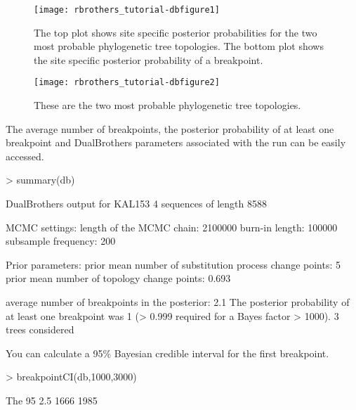 \documentclass[12pt]{article}
\begin{document}
\begin{figure}[!t]
  \centering
\texttt{[image: rbrothers\_tutorial-dbfigure1]}
\caption{The top plot shows site specific posterior probabilities for the two most probable phylogenetic tree topologies. The bottom plot shows the site specific posterior probability of a breakpoint.}
\label{KALplot}
\end{figure}  

\begin{figure}[!t]
  \centering
\texttt{[image: rbrothers\_tutorial-dbfigure2]}
\caption{These are the two most probable phylogenetic tree topologies.}
\label{KALplot2}
\end{figure}  


The average number of breakpoints, the posterior probability of at least one breakpoint and DualBrothers parameters associated with the run can be easily accessed.
\begin{Schunk}
\begin{Sinput}
> summary(db)
\end{Sinput}
\begin{Soutput}
DualBrothers output for KAL153 
4 sequences of length 8588 

MCMC settings: 
length of the MCMC chain: 2100000 
burn-in length: 100000 
subsample frequency: 200 

Prior parameters: 
prior mean number of substitution process change points: 5 
prior mean number of topology change points: 0.693 

average number of breakpoints in the posterior: 2.1 
The posterior probability of at least one breakpoint was 1  (> 0.999  required for a Bayes factor > 1000). 
3 trees considered 
\end{Soutput}
\end{Schunk}

You can calculate a 95\% Bayesian credible interval for the first breakpoint.
\begin{Schunk}
\begin{Sinput}
> breakpointCI(db,1000,3000)
\end{Sinput}
\begin{Soutput}
The 95% credible interval for a single break point between nucleotide number 1000 and nucleotide number 3000 is:
 2.5% 97.5% 
 1666  1985 
\end{Soutput}
\end{Schunk}


\end{document}
